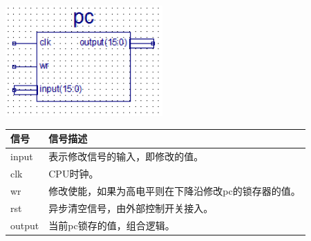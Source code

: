 \begin{center}
    \includegraphics[width=6cm]{image/detail/detail_pc.png}
    \label{fig:pc}
\end{center}
\begin{center}
    \label{table:pc}
    \begin{longtable}{p{}p{}}
        \toprule
        信号 & 信号描述 \\
        \midrule
            input & 表示修改信号的输入，即修改的值。\\
            clk & CPU时钟。\\
            wr & 修改使能，如果为高电平则在下降沿修改pc的锁存器的值。\\
            rst & 异步清空信号，由外部控制开关接入。\\
            output & 当前pc锁存的值，组合逻辑。\\
        \bottomrule
    \end{longtable}
\end{center}

